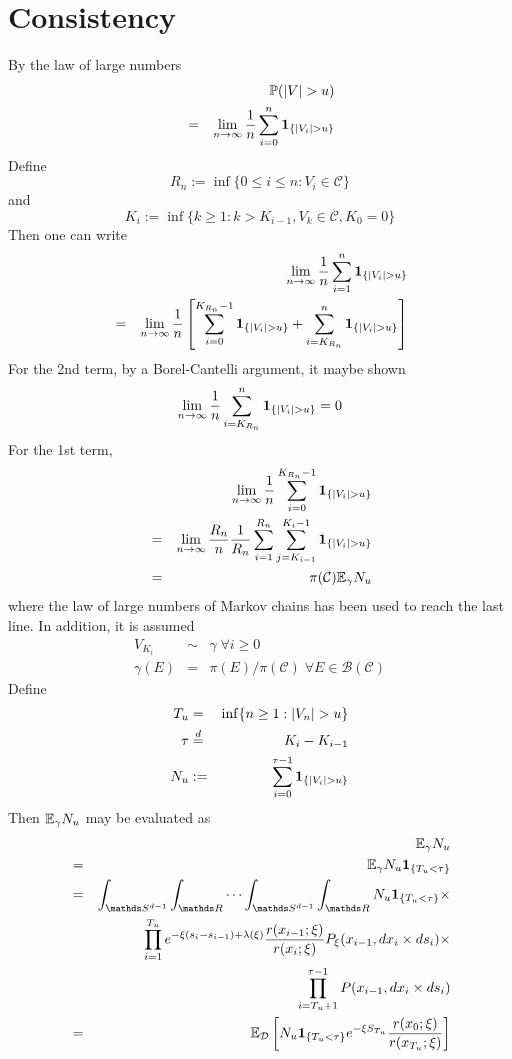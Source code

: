\documentclass{article}
\begin{document}
\section{Consistency}\label{sec:consistency}
By the law of large numbers
\begin{eqnarray*}
  && \mathbb{P}(|V| > u) \\
  &=& \lim_{n \to \infty} {1 \over n} \sum_{i=0}^n \mathbf{1}_{\{|V_i| > u\}}
\end{eqnarray*}
Define
\[
R_n := \inf\{0 \leq i \leq n: V_i \in \mathcal C\}
\]
and
\[
K_i := \inf\{k \geq 1: k > K_{i-1}, V_k \in \mathcal C, K_0 = 0\}
\]
Then one can write
\begin{eqnarray*}
  && \lim_{n \to \infty} {1 \over n} \sum_{i=1}^n \mathbf{1}_{\{|V_i| > u\}} \\
  &=& \lim_{n \to \infty} {1 \over n} \left[
    \sum_{i=0}^{K_{R_n}-1} \mathbf{1}_{\{|V_i| > u\}} + \sum_{i=K_{R_n}}^n \mathbf{1}_{\{|V_i| > u\}}
\right]
\end{eqnarray*}
For the 2nd term, by a Borel-Cantelli argument, it maybe shown
\[
\lim_{n \to \infty} {1 \over n}\sum_{i=K_{R_n}}^n \mathbf{1}_{\{|V_i| > u\}} = 0
\]
For the 1st term,
\begin{eqnarray*}
&& \lim_{n \to \infty} {1 \over n} \sum_{i=0}^{K_{R_n}-1} \mathbf{1}_{\{|V_i| >
  u\}}  \\
&=& \lim_{n \to \infty} {R_n \over n} {1 \over R_n} \sum_{i=1}^{R_n}
\sum_{j=K_{i-1}}^{K_i-1}\mathbf{1}_{\{|V_i| > u\}} \\
&=& \pi(\mathcal C) \mathbb{E}_\gamma N_u
\end{eqnarray*}
where the law of large numbers of Markov chains has been used to reach
the last line. In addition, it is assumed
\begin{eqnarray*}
  V_{K_i} &\sim& \gamma \; \forall i \geq 0 \\
  \gamma(E) &=& \pi(E)/\pi(\mathcal C)\; \forall E \in \mathcal
  B(\mathcal C)
\end{eqnarray*}
Define
\begin{eqnarray*}
  T_u &=& \inf\{n \geq 1: |V_n| > u\} \\
  \tau &\overset{d}{=}& K_i - K_{i-1} \\
  N_u &:=& \sum_{i=0}^{\tau-1} \mathbf{1}_{\{|V_i| > u\}}  \\
\end{eqnarray*}
Then $\mathbb{E}_\gamma N_u$ may be evaluated as
\begin{eqnarray*}
  && \E_\gamma N_u \\
  &=& \E_\gamma N_u \1{T_u < \tau} \\
  &=& \int_{\mathds S^{d-1}} \int_{\mathds R} \cdots \int_{\mathds
    S^{d-1}} \int_{\mathds R} N_u \1{T_u < \tau} \times \\
  && \prod_{i=1}^{T_u} e^{-\xi(s_i - s_{i-1}) + \lambda(\xi)}
  {r(x_{i-1}; \xi) \over r(x_{i}; \xi)}P_\xi(x_{i-1}, dx_i \times ds_i) \times \\
  && \prod_{i=T_u+1}^{\tau-1} P(x_{i-1}, dx_i \times d s_i) \\
  &=& \E_{\mathcal D} \left[
    N_u \1{T_u < \tau} e^{-\xi S_{T_u}} {r(x_0; \xi)
      \over r(x_{T_u}; \xi)}
  \right]
\end{eqnarray*}
\end{document}
